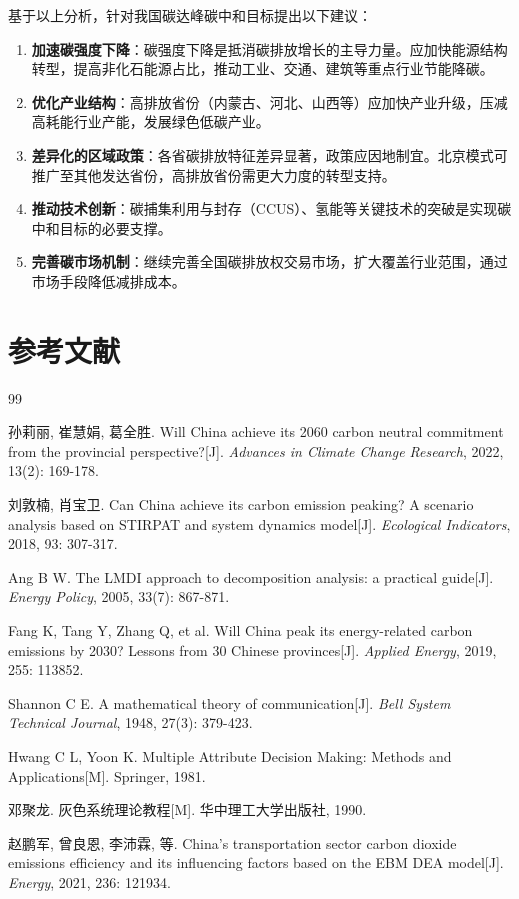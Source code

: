 \documentclass[12pt, a4paper]{article}
\begin{document}
基于以上分析，针对我国碳达峰碳中和目标提出以下建议：

\begin{enumerate}
    \item \textbf{加速碳强度下降}：碳强度下降是抵消碳排放增长的主导力量。应加快能源结构转型，提高非化石能源占比，推动工业、交通、建筑等重点行业节能降碳。
    \item \textbf{优化产业结构}：高排放省份（内蒙古、河北、山西等）应加快产业升级，压减高耗能行业产能，发展绿色低碳产业。
    \item \textbf{差异化的区域政策}：各省碳排放特征差异显著，政策应因地制宜。北京模式可推广至其他发达省份，高排放省份需更大力度的转型支持。
    \item \textbf{推动技术创新}：碳捕集利用与封存（CCUS）、氢能等关键技术的突破是实现碳中和目标的必要支撑。
    \item \textbf{完善碳市场机制}：继续完善全国碳排放权交易市场，扩大覆盖行业范围，通过市场手段降低减排成本。
\end{enumerate}

\section*{参考文献}

\begin{thebibliography}{99}

孙莉丽, 崔慧娟, 葛全胜. Will China achieve its 2060 carbon neutral commitment from the provincial perspective?[J]. \textit{Advances in Climate Change Research}, 2022, 13(2): 169-178.

刘敦楠, 肖宝卫. Can China achieve its carbon emission peaking? A scenario analysis based on STIRPAT and system dynamics model[J]. \textit{Ecological Indicators}, 2018, 93: 307-317.

Ang B W. The LMDI approach to decomposition analysis: a practical guide[J]. \textit{Energy Policy}, 2005, 33(7): 867-871.

Fang K, Tang Y, Zhang Q, et al. Will China peak its energy-related carbon emissions by 2030? Lessons from 30 Chinese provinces[J]. \textit{Applied Energy}, 2019, 255: 113852.

Shannon C E. A mathematical theory of communication[J]. \textit{Bell System Technical Journal}, 1948, 27(3): 379-423.

Hwang C L, Yoon K. Multiple Attribute Decision Making: Methods and Applications[M]. Springer, 1981.

邓聚龙. 灰色系统理论教程[M]. 华中理工大学出版社, 1990.

赵鹏军, 曾良恩, 李沛霖, 等. China's transportation sector carbon dioxide emissions efficiency and its influencing factors based on the EBM DEA model[J]. \textit{Energy}, 2021, 236: 121934.

\end{thebibliography}
\end{document}
